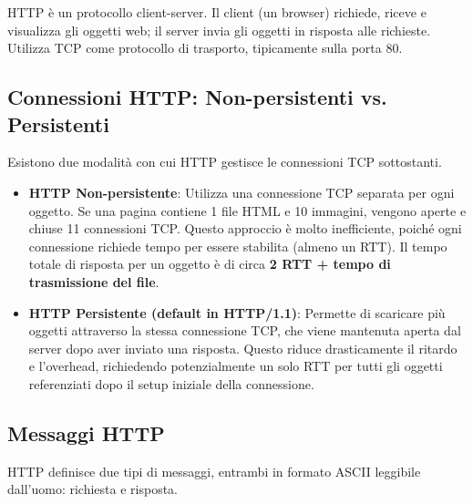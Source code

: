 
HTTP è un protocollo client-server. Il client (un browser) richiede, riceve e visualizza gli oggetti web; il server invia gli oggetti in risposta alle richieste. Utilizza TCP come protocollo di trasporto, tipicamente sulla porta 80.


\subsection{Connessioni HTTP: Non-persistenti vs. Persistenti}
Esistono due modalità con cui HTTP gestisce le connessioni TCP sottostanti.
\begin{itemize}
    \item \textbf{HTTP Non-persistente}: Utilizza una connessione TCP separata per ogni oggetto. Se una pagina contiene 1 file HTML e 10 immagini, vengono aperte e chiuse 11 connessioni TCP. Questo approccio è molto inefficiente, poiché ogni connessione richiede tempo per essere stabilita (almeno un RTT). Il tempo totale di risposta per un oggetto è di circa \textbf{2 RTT + tempo di trasmissione del file}.
    \item \textbf{HTTP Persistente (default in HTTP/1.1)}: Permette di scaricare più oggetti attraverso la stessa connessione TCP, che viene mantenuta aperta dal server dopo aver inviato una risposta. Questo riduce drasticamente il ritardo e l'overhead, richiedendo potenzialmente un solo RTT per tutti gli oggetti referenziati dopo il setup iniziale della connessione.
\end{itemize}

\subsection{Messaggi HTTP}
HTTP definisce due tipi di messaggi, entrambi in formato ASCII leggibile dall'uomo: richiesta e risposta.

